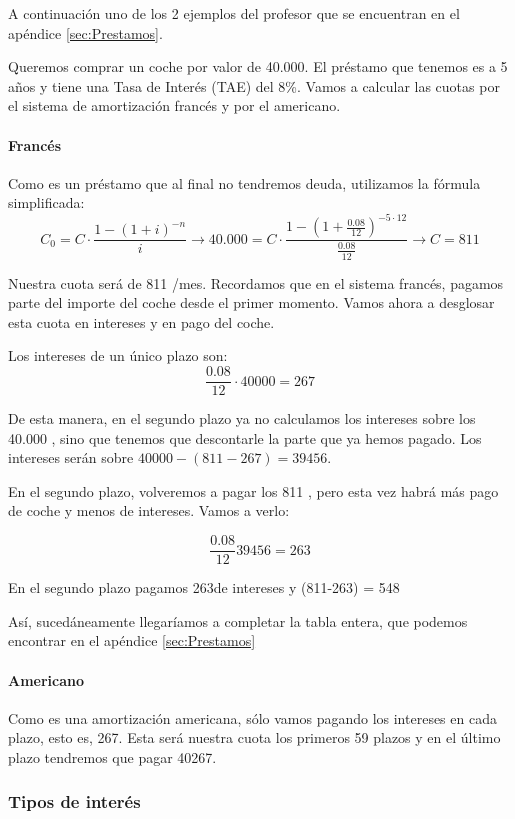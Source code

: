 \documentclass[nochap,palatino,shortheader]{apuntes}
\begin{document}
A continuación uno de los 2 ejemplos del profesor que se encuentran en el apéndice \ref{sec:Prestamos}.

\begin{example}
Queremos comprar un coche por valor de 40.000\texteuro. El préstamo que tenemos es a 5 años y tiene una Tasa de Interés (TAE) del 8\%.
Vamos a calcular las cuotas por el sistema de amortización francés y por el americano.

\paragraph{Francés}
Como es un préstamo que al final no tendremos deuda, utilizamos la fórmula simplificada:
\[C_0 = C·\frac{1-(1+i)^{-n}}{i} \to 40.000 = C·\frac{1-\left(1+\frac{0.08}{12}\right)^{-5·12}}{\frac{0.08}{12}} \to C = 811 \]

Nuestra cuota será de 811 \texteuro/mes. Recordamos que en el sistema francés, pagamos parte del importe del coche desde el primer momento. Vamos ahora a desglosar esta cuota en intereses y en pago del coche.

Los intereses de un único plazo son: \[\frac{0.08}{12}·40000 = 267\]

De esta manera, en el segundo plazo ya no calculamos los intereses sobre los 40.000 \texteuro, sino que tenemos que descontarle la parte que ya hemos pagado. Los intereses serán sobre $40000 - (811-267) = 39456$.

En el segundo plazo, volveremos a pagar los 811 \texteuro, pero esta vez habrá más pago de coche y menos de intereses. Vamos a verlo:

\[
\frac{0.08}{12}39456 = 263
\]

En el segundo plazo pagamos 263\texteuro de intereses y (811-263) = 548 \texteuro

Así, sucedáneamente llegaríamos a completar la tabla entera, que podemos encontrar en el apéndice \ref{sec:Prestamos}

\paragraph{Americano} Como es una amortización americana, sólo vamos pagando los intereses en cada plazo, esto es, 267\texteuro. Esta será nuestra cuota los primeros 59 plazos y en el último plazo tendremos que pagar 40267\texteuro.
\end{example}


\subsubsection{Tipos de interés}\label{sec:TiposInteres}
\end{document}
